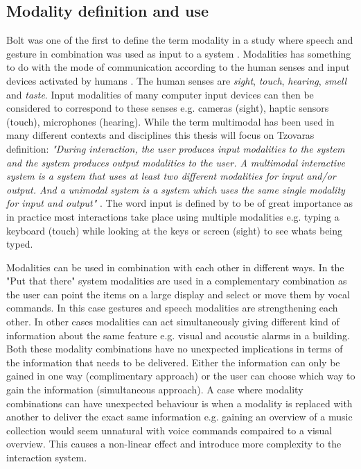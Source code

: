\subsection{Modality definition and use}
Bolt was one of the first to define the term modality in a study where speech and gesture in combination was used as input to a system \cite{bolt_put-that-there:_1980}. Modalities has something to do with the mode of communication according to the human senses and input devices activated by humans \cite{jaimes_multimodal_2007,tzovaras_dimitrios_multimodal_2008}. The human senses are \textit{sight}, \textit{touch}, \textit{hearing}, \textit{smell} and \textit{taste}. Input modalities of many computer input devices can then be considered to correspond to these senses e.g. cameras (sight), haptic sensors (touch), microphones (hearing). While the term multimodal has been used in many different contexts and disciplines this thesis will focus on Tzovaras definition: \textit{"During interaction, the user produces input modalities to the system and the system produces output modalities to the user. A multimodal interactive system is a system that uses at least two different modalities for input and/or output. And a unimodal system is a system which uses the same single modality for input and output"} \cite{tzovaras_dimitrios_multimodal_2008}. The word input is defined by \cite{jaimes_multimodal_2007} to be of great importance as in practice most interactions take place using multiple modalities e.g. typing a keyboard (touch) while looking at the keys or screen (sight) to see whats being typed.

Modalities can be used in combination with each other in different ways. In the "Put that there" system \cite{bolt_put-that-there:_1980} modalities are used in a complementary combination as the user can point the items on a large display and select or move them by vocal commands. In this case gestures and speech modalities are strengthening each other. In other cases modalities can act simultaneously giving different kind of information about the same feature e.g. visual and acoustic alarms in a building. Both these modality combinations have no unexpected implications in terms of the information that needs to be delivered. Either the information can only be gained in one way (complimentary approach) or the user can choose which way to gain the information (simultaneous approach). A case where modality combinations can have unexpected behaviour is when a modality is replaced with another to deliver the exact same information e.g. gaining an overview of a music collection would seem unnatural with voice commands compaired to a visual overview. This causes a non-linear effect and introduce more complexity to the interaction system.

